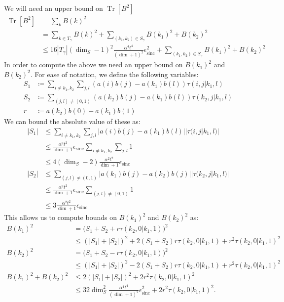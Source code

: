 \documentclass{article}
\newcommand{\brackets}[1]{\left[ #1 \right]}
\newcommand{\abs}[1]{\left| #1 \right|}
\DeclareMathOperator{\Tr}{Tr}
\newcommand{\trace}[1]{\Tr \brackets{ #1 }}
\DeclareMathOperator{\sinc}{sinc}
\begin{document}
    We will need an upper bound on $\trace{B^2}$
    \begin{align}
        \trace{B^2} &= \sum_k B(k)^2 \\
        &= \sum_{k \in T_{\gamma}} B(k)^2 + \sum_{(k_1, k_2) \in S_{\gamma}} B(k_1)^2 + B(k_2)^2 \\
        &\leq 16 |T_{\gamma}| (\dim_S - 1)^2 \frac{\alpha^4 t^4}{(\dim + 1)^2}\epsilon_{\sinc}^2 + \sum_{(k_1, k_2) \in S_{\gamma}} B(k_1)^2 + B(k_2)^2
    \end{align}
    In order to compute the above we need an upper bound on $B(k_1)^2$ and $B(k_2)^2$. For ease of notation, we define the following variables:
    \begin{align}
        S_1 &\coloneqq \sum_{i \neq k_1, k_2} \sum_{j,l} (a(i) b(j) - a(k_1) b(l)) \tau(i, j|k_1, l) \\
        S_2 &\coloneqq \sum_{(j,l) \neq (0, 1)} (a(k_2) b(j) - a(k_1) b(l)) \tau(k_2, j| k_1, l) \\
        r &\coloneqq a(k_2) b(0) - a(k_1) b(1) 
    \end{align}
    We can bound the absolute value of these as:
    \begin{align}
        \abs{S_1} &\leq \sum_{i \neq k_1, k_2} \sum_{j,l} |a(i) b(j) - a(k_1) b(l)| |\tau(i, j|k_1, l)| \\
        &\leq \frac{\alpha^2 t^2}{\dim + 1} \epsilon_{\sinc} \sum_{i \neq k_1, k_2} \sum_{j,l} 1\\
        &\leq 4 (\dim_S - 2) \frac{\alpha^2 t^2}{\dim + 1} \epsilon_{\sinc} \\
        \abs{S_2} &\leq \sum_{(j,l) \neq (0,1)} |a(k_1) b(j) - a(k_2) b(j)| |\tau(k_2, j | k_1, l)| \\
        &\leq \frac{\alpha^2 t^2}{\dim + 1} \epsilon_{\sinc} \sum_{(j,l) \neq (0,1)} 1 \\
        &\leq 3 \frac{\alpha^2 t^2}{\dim + 1} \epsilon_{\sinc}
    \end{align}
    This allows us to compute bounds on $B(k_1)^2$ and $B(k_2)^2$ as:
    \begin{align}
        B(k_1)^2 &= \bigg( S_1 + S_2 + r \tau(k_2, 0| k_1, 1) \bigg)^2 \\
        &\leq (|S_1| + |S_2|)^2 + 2(S_1 + S_2) r \tau(k_2, 0| k_1, 1) + r^2 \tau(k_2, 0| k_1, 1)^2 \\
        B(k_2)^2 &= \bigg( S_1 + S_2 - r \tau(k_2, 0 | k_1, 1) \bigg)^2 \\
        &\leq (|S_1| + |S_2|)^2 - 2 (S_1 + S_2) r \tau(k_2, 0 | k_1, 1) + r^2 \tau(k_2, 0 | k_1, 1)^2 \\
        B(k_1)^2 + B(k_2)^2 &\leq 2 (|S_1| + |S_2|)^2 + 2 r^2 \tau(k_2, 0 | k_1, 1)^2 \\
        &\leq 32 \dim_S^2 \frac{\alpha^4 t^4}{(\dim + 1)^2} \epsilon_{\sinc}^2 + 2 r^2 \tau(k_2, 0 | k_1, 1)^2.
    \end{align}
\end{document}
